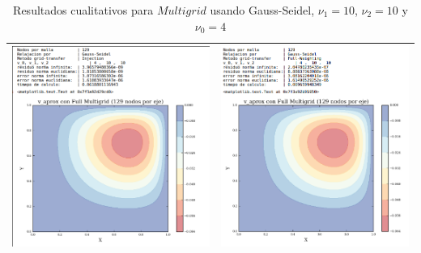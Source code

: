 \documentclass[letter,10pt]{article}
\begin{document}
\begin{table}[H]
\centering
\caption{Resultados cualitativos para $Multigrid$ usando Gauss-Seidel, $\nu_1=10$, $\nu_2=10$ y $\nu_0=4$}
\begin{tabular}[t]{|c|c|}
\hline
\includegraphics[scale=0.55]{img/fmg/inject10104}& \includegraphics[scale=0.55]{img/fmg/FW10104}\\ \hline
\end{tabular}

\label{cualitmg10104}
\end{table}
\end{document}
